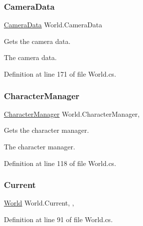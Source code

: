 \subsubsection{\texorpdfstring{Camera\+Data}{CameraData}}
{\footnotesize\ttfamily \hyperlink{class_camera_data}{Camera\+Data} World.\+Camera\+Data\hspace{0.3cm}{\ttfamily [get]}}



Gets the camera data. 

The camera data.

Definition at line 171 of file World.\+cs.

\mbox{\label{class_world_aa17d26c9ced535874e16cf3f7e2da99d}} 
\subsubsection{\texorpdfstring{Character\+Manager}{CharacterManager}}
{\footnotesize\ttfamily \hyperlink{class_project_porcupine_1_1_entities_1_1_character_manager}{Character\+Manager} World.\+Character\+Manager\hspace{0.3cm}{\ttfamily [get]}, {}}



Gets the character manager. 

The character manager.

Definition at line 118 of file World.\+cs.

\mbox{\label{class_world_a611a474efcbf8859dc219c66e667abb4}} 
\subsubsection{\texorpdfstring{Current}{Current}}
{\footnotesize\ttfamily \hyperlink{class_world}{World} World.\+Current\hspace{0.3cm}{\ttfamily [static]}, {\ttfamily [get]}, {}}



Definition at line 91 of file World.\+cs.

\mbox{\label{class_world_a67394494a39fdb85e259e9db96836b8b}} 
